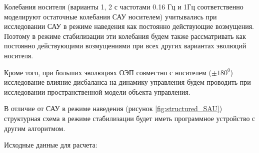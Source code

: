 Колебания носителя (варианты 1, 2 с частотами 0.16 Гц и 1Гц соответственно моделируют остаточные колебания САУ носителем) учитывались при исследовании САУ в режиме наведения как постоянно действующие возмущения. Поэтому в режиме стабилизации эти колебания будем также рассматривать как постоянно действующими возмущениями при всех других вариантах эволюций носителя.

Кроме того, при больших эволюциях ОЭП совместно с носителем ($\pm180^0$) исследование влияние дисбаланса на динамику управления будем проводить при исследовании пространственной модели объекта управления.


В отличие от САУ в режиме наведения (рисунок \ref{fig:structured_SAU}) структурная схема в режиме стабилизации будет иметь программное устройство с другим алгоритмом.

Исходные данные для расчета:

\begin{comment}
\begin{equation}
\label{eq:p4:425}
\begin{array}{ll}
\alpha_{\textit{вх1}}(t) = \psi_{01}(t) + \psi_{1}(t) + \psi_{2}(t),\\
\psi_{01}(t) =0.21 t, 
\psi_{1}(t) = 0.035 sin(6.28 t),
\psi_{2}(t) = 0.21 sin(t),\\
\alpha_{\textit{вх2}} = \psi_{0i}(t) + \psi_{1}(t) + \psi_{2}(t),\\
\psi_{0i}(t) = A_i sin(\omega_i t), (i=3,4,5),\\
\alpha_{\textit{вх}} =\alpha_{\textit{вх1}}+\alpha_{\textit{вх2}},\\
M_{\textit{тр}} = 0.08 sign( \dot \alpha ) \textit{Нм},\\
T_{M1} = 1.08 c, T_{e1} = 0.1 mc, T_{k1} = 0.05 c, T_{k2} = 0.5 mc,\\
K_{p1} = 3.7 \textit{рад/Вс}, K_{m1} = 3.29 \textit{рад/Нмс}, 
K_{с1} = 3700 \textit{с}^{-1},\\
K_{d1}K_{u1}K_{k1} = 1000 \textit{В/рад},\\
U_{max} = \pm 27 \textit{В}, \varDelta_{\textit{ду}} = 1.3183 \textit{угл.мин}, 
f_y = 16 \textit{кГц}
\end{array}
\end{equation}
 kkkkkkk
\end{comment}

